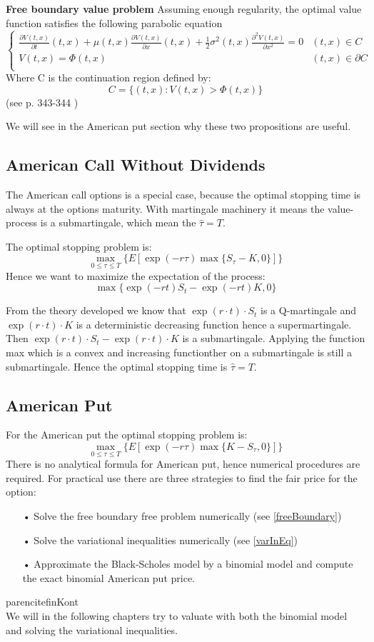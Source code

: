 \begin{proposition}{\textbf{Free boundary value problem}}\label{freeBoundary}
Assuming enough regularity, the optimal value function satisfies the following parabolic equation
\[ \begin{cases} 
      \frac{\partial V(t,x)}{\partial t}(t,x) + \mu(t,x) \frac{\partial V(t,x)}{\partial x}(t,x) + \frac{1}{2}\sigma^2(t,x)\frac{\partial^2 V(t,x)}{\partial x^2}=0 & (t,x)\in C \\
     V(t,x)=\Phi(t,x)  & (t,x)\in \partial C \\
   \end{cases}
\]
Where C is the continuation region defined by:
$$C=\{(t,x): V(t,x)>\Phi(t,x) \}$$
(see p. 343-344 \parencite{finKont})
\end{proposition}

We will see in the American put section why these two propositions are useful.

\subsection{American Call Without Dividends}
The American call options is a special case, because the optimal stopping time is always at the options maturity. With martingale machinery it means the value-process is a submartingale, which mean the $\hat{\tau}=T$.

The optimal stopping problem is:
$$\max_{0 \leq \tau\leq T}\{E[\exp(-r \tau) \max\{S_{\tau} - K, 0\}]\}$$
Hence we want to maximize the expectation of the process:
$$ \max\{ \exp(-r t) S_{t} - \exp(-r t) K, 0 \}$$

From the theory developed we know that $\exp(r\cdot t) \cdot S_t$ is a Q-martingale and $\exp(r\cdot t) \cdot K$ is a deterministic decreasing function hence a supermartingale. Then $\exp(r\cdot t) \cdot S_t - \exp(r\cdot t) \cdot K$ is a submartingale. Applying the function max which is a convex and increasing functionther on a submartingale is still a submartingale. Hence the optimal stopping time is $\hat{\tau}=T$.

\subsection{American Put}
For the American put the optimal stopping problem is:
$$\max_{0 \leq \tau\leq T}\{E[\exp(-r \tau) \max\{K - S_{\tau}, 0\}]\}$$
There is no analytical formula for American put, hence numerical procedures are required. For practical use there are three strategies to find the fair price for the option:
\begin{enumerate}
\item[•] Solve the free boundary free problem numerically (see \ref{freeBoundary})
\item[•] Solve the variational inequalities numerically (see \ref{varInEq})
\item[•] Approximate the Black-Scholes model by a binomial model and compute the exact binomial American put price.
\end{enumerate}
parencite{finKont}\\

We will in the following chapters try to valuate with both the binomial model and solving the variational inequalities.
